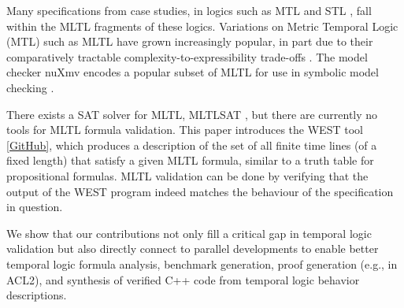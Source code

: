 \documentclass[runningheads]{llncs}
\begin{document}
Many specifications from case studies, in logics such as MTL \cite{AH90} and STL \cite{MN04}, fall within the MLTL fragments of these logics. 
Variations on Metric Temporal Logic (MTL) such as MLTL have grown increasingly popular, in part due to their comparatively tractable complexity-to-expressibility trade-offs \cite{OW08}.
The model checker {\sf nuXmv} encodes a popular subset of MLTL for use in symbolic model checking \cite{nuXmv-v1.1.0}.%

There exists a SAT solver for MLTL, MLTLSAT \cite{LVR22}, but there are currently no tools for MLTL formula validation. This paper introduces the WEST tool \href{https://github.com/zwang271/2022-Iowa-State-REU-Temporal-Logic-}{[GitHub]}, which produces a description of the set of all finite time lines (of a fixed length) that satisfy a given MLTL formula, similar to a truth table for propositional formulas. MLTL validation can be done by verifying that the output of the WEST program indeed matches the behaviour of the specification in question.


We show that our contributions not only fill a critical gap in temporal logic validation but also directly connect to parallel developments to enable better temporal logic formula analysis, benchmark generation, proof generation (e.g., in ACL2), and synthesis of verified C++ code from temporal logic behavior descriptions. 

\end{document}
